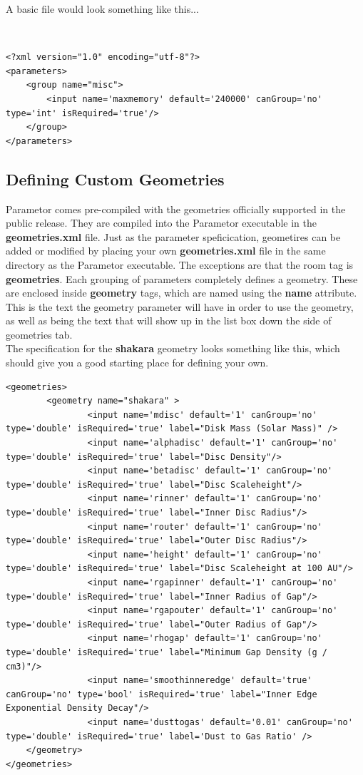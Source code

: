 \documentclass[a4paper,10pt]{article}
\begin{document}
A basic file would look something like this...

\
\begin{lstlisting}
<?xml version="1.0" encoding="utf-8"?>
<parameters>
    <group name="misc">
        <input name='maxmemory' default='240000' canGroup='no' type='int' isRequired='true'/>
    </group>
</parameters>
\end{lstlisting}

\subsection{Defining Custom Geometries}
Parametor comes pre-compiled with the geometries officially supported in the public release. They are compiled into the Parametor executable in the \textbf{geometries.xml} file. Just as the parameter speficication, geometires can be added or modified by placing your own \textbf{geometries.xml} file in the same directory as the Parametor executable. The exceptions are that the room tag is \textbf{geometries}. Each grouping of parameters completely defines a geometry. These are enclosed inside \textbf{geometry} tags, which are named using the \textbf{name} attribute. This is the text the geometry parameter will have in order to use the geometry, as well as being the text that will show up in the list box down the side of geometries tab.
\\
The specification for the \textbf{shakara} geometry looks something like this, which should give you a good starting place for defining your own.
\begin{lstlisting}
<geometries>
        <geometry name="shakara" >
                <input name='mdisc' default='1' canGroup='no' type='double' isRequired='true' label="Disk Mass (Solar Mass)" />
                <input name='alphadisc' default='1' canGroup='no' type='double' isRequired='true' label="Disc Density"/>
                <input name='betadisc' default='1' canGroup='no' type='double' isRequired='true' label="Disc Scaleheight"/>
                <input name='rinner' default='1' canGroup='no' type='double' isRequired='true' label="Inner Disc Radius"/>
                <input name='router' default='1' canGroup='no' type='double' isRequired='true' label="Outer Disc Radius"/>
                <input name='height' default='1' canGroup='no' type='double' isRequired='true' label="Disc Scaleheight at 100 AU"/>
                <input name='rgapinner' default='1' canGroup='no' type='double' isRequired='true' label="Inner Radius of Gap"/>
                <input name='rgapouter' default='1' canGroup='no' type='double' isRequired='true' label="Outer Radius of Gap"/>
                <input name='rhogap' default='1' canGroup='no' type='double' isRequired='true' label="Minimum Gap Density (g / cm3)"/>
                <input name='smoothinneredge' default='true' canGroup='no' type='bool' isRequired='true' label="Inner Edge Exponential Density Decay"/>
                <input name='dusttogas' default='0.01' canGroup='no' type='double' isRequired='true' label='Dust to Gas Ratio' />
	</geometry>
</geometries>
\end{lstlisting}
\end{document}
